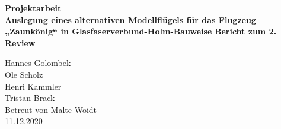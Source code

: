 \begin{center}
\begin{large}
	\textbf{Projektarbeit}\\

	\textbf{Auslegung eines alternativen Modellflügels für das Flugzeug „Zaunkönig“ in Glasfaserverbund-Holm-Bauweise}
	\textbf{Bericht zum 2. Review}\\
\end{large}

Hannes Golombek\\
Ole Scholz\\
Henri Kammler\\
Tristan Brack\\
Betreut von Malte Woidt\\
11.12.2020\\
\end{center}

